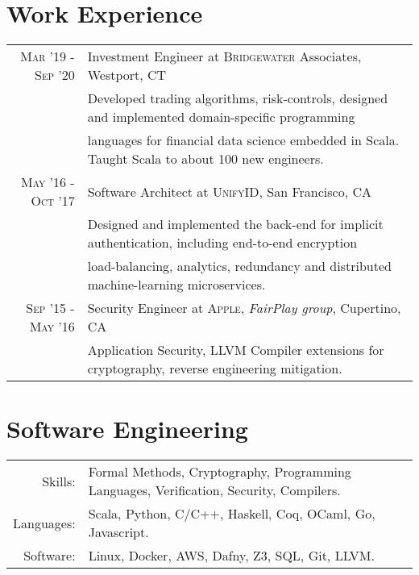 \documentclass[lettersize,11pt]{article}
\begin{document}
\section{Work Experience}
\begin{tabular}{rl}
\textsc{Mar} '19 - \textsc{Sep} '20 & Investment Engineer at \textsc{Bridgewater} Associates, Westport, CT\\
&\footnotesize{Developed trading algorithms, risk-controls, designed and implemented domain-specific programming}\\
&\footnotesize{languages for financial data science embedded in Scala. Taught Scala to about 100 new engineers.}\\[0.5em]
\textsc{May} '16 - \textsc{Oct} '17 & Software Architect at \textsc{UnifyID}, San Francisco, CA\\
&\footnotesize{Designed and implemented the back-end for implicit authentication, including end-to-end encryption}\\
&\footnotesize{load-balancing, analytics, redundancy and distributed machine-learning microservices.}\\[0.5em]
\textsc{Sep} '15 - \textsc{May} '16 & Security Engineer at \textsc{Apple}, \emph{FairPlay group}, Cupertino, CA \\
&\footnotesize{Application Security, LLVM Compiler extensions for cryptography, reverse engineering mitigation.}\\[0.5em]
\end{tabular}

\section{Software Engineering}
\begin{tabular}{rl}
Skills:& Formal Methods, Cryptography, Programming Languages, Verification, Security, Compilers. \\
Languages: & Scala, Python, C/C++, Haskell, Coq, OCaml, Go, Javascript. \\
Software:& Linux, Docker, AWS, Dafny, Z3, SQL, Git, LLVM. \\
\end{tabular}
\end{document}
